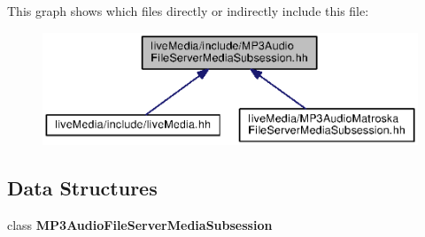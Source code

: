 This graph shows which files directly or indirectly include this file\+:
\nopagebreak
\begin{figure}[H]
\begin{center}
\leavevmode
\includegraphics[width=350pt]{MP3AudioFileServerMediaSubsession_8hh__dep__incl}
\end{center}
\end{figure}
\subsection*{Data Structures}
\begin{DoxyCompactItemize}
\item 
class {\bf M\+P3\+Audio\+File\+Server\+Media\+Subsession}
\end{DoxyCompactItemize}
